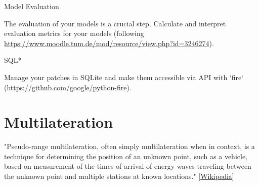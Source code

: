 \documentclass[twoside]{article}
\begin{document}
\begin{task}{Model Evaluation}{}{}

The evaluation of your models is a crucial step. Calculate and interpret evaluation metrics for your models (following \url{https://www.moodle.tum.de/mod/resource/view.php?id=3246274}).


\end{task}

\begin{task}{SQL*}{}{}

Manage your patches in SQLite and make them accessible via API with `fire` (\url{https://github.com/google/python-fire}).


\end{task}

\newpage
\section{Multilateration}
"Pseudo-range multilateration, often simply multilateration when in context, is a technique for determining the position of an unknown point, such as a vehicle, based on measurement of the times of arrival of energy waves traveling between the unknown point and multiple stations at known locations." [\href{https://en.wikipedia.org/wiki/Pseudo-range\_multilateration}{Wikipedia}]
\end{document}
